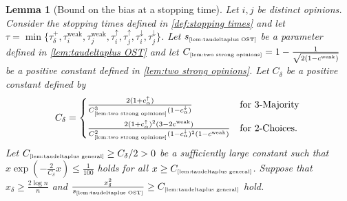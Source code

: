 \documentclass[letterpaper,11pt]{article}
\newtheorem{lemma}[theorem]{Lemma}
\newcommand{\indicator}{\mathbf{1}}
\DeclareMathOperator*{\E}{\mathbb{E}}
\DeclareMathOperator*{\Var}{\mathbf{Var}}
\newcommand{\constref}[1]{C_{\mbox{\tiny\ref{#1}}}}
\newcommand{\varianceref}[1]{\variance_{\mbox{\tiny\ref{#1}}}}
\newcommand{\taudeltaplus}{\tau^{+}_\delta}
\newcommand{\cweak}{c^{\mathrm{weak}}}
\newcommand{\calphaup}{c^{\uparrow}_\alpha}
\newcommand{\calphadown}{c^{\downarrow}_\alpha}
\newcommand{\variance}{s}
\newcommand{\tauiup}{\tau^{\uparrow}_i}
\newcommand{\tauidown}{\tau^{\downarrow}_i}
\newcommand{\tauiweak}{\tau^{\mathrm{weak}}_i}
\newcommand{\taujweak}{\tau^{\mathrm{weak}}_j}
\newcommand{\taujup}{\tau^{\uparrow}_j}
\newcommand{\taujdown}{\tau^{\downarrow}_j}
\newcommand{\xdelta}{x_{\delta}}
\newcommand{\Cdeltavarplus}{C_{\delta}}
\newcommand{\Csyncinitial}{C_{\mathrm{s}}}
\begin{document}
\begin{lemma}[Bound on the bias at a stopping time]
    \label{lem:taudeltaplus general}
    Let $ i,j $ be distinct opinions.
    Consider the stopping times %
    defined in \cref{def:stopping times} and let $\tau=\min\{\taudeltaplus,\tauiweak,\taujweak,\tauiup,\taujup,\tauidown,\taujdown\}$.
    Let $\varianceref{lem:taudeltaplus OST}$ be a parameter defined in \cref{lem:taudeltaplus OST} and
    let $\constref{lem:two strong opinions}= 1-\frac{1}{\sqrt{2(1-\cweak)}}$ be a positive constant defined in \cref{lem:two strong opinions}.
    Let $\Cdeltavarplus$ be a positive constant defined by
    \begin{align*}
        \Cdeltavarplus=
        \begin{cases*}
            \frac{2(1+\calphaup)}{\constref{lem:two strong opinions}^3(1-\calphadown)}& \text{for 3-Majority}\\
            \frac{2(1+\calphaup)^2(3-2\cweak)}{\constref{lem:two strong opinions}^2(1-\calphadown)^2(1-\cweak)}& \text{for 2-Choices}.
        \end{cases*}
    \end{align*}
    Let $\constref{lem:taudeltaplus general}\geq \Cdeltavarplus/2>0$ be a sufficiently large constant such that $x\exp(-\frac{2}{\Cdeltavarplus}x)\leq \frac{1}{100}$ holds for all $x\geq \constref{lem:taudeltaplus general}$.
    Suppose that $\xdelta\geq \frac{2\log n}{n}$ and $\frac{\xdelta^2}{\varianceref{lem:taudeltaplus OST}}\geq \constref{lem:taudeltaplus general}$ hold.

\end{lemma}
\end{document}
